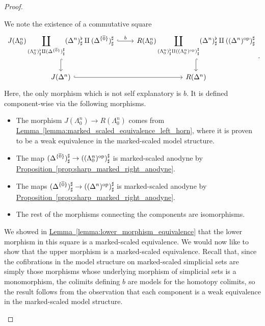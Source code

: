 \documentclass[main.tex]{subfiles}
\begin{document}
\begin{proof}
\begin{enumerate}
      We note the existence of a commutative square
      \begin{equation*}
        \begin{tikzcd}
          J(\Lambda^{n}_{0}) \displaystyle\coprod_{(\Lambda^{n}_{0})^{\flat}_{\sharp} \amalg (\Delta^{\{\overline{0}\}})^{\sharp}_{\sharp}}(\Delta^{n})^{\flat}_{\sharp} \amalg (\Delta^{\{\overline{0}\}})^{\sharp}_{\sharp}
          \arrow[r, hook, "b"]
          \arrow[d, hook]
          & R(\Lambda^{n}_{0}) \displaystyle\coprod_{(\Lambda^{n}_{0})^{\flat}_{\sharp} \amalg ((\Lambda^{n}_{0})\op)^{\sharp}_{\sharp}}(\Delta^{n})^{\flat}_{\sharp} \amalg ((\Delta^{n})\op)^{\sharp}_{\sharp}
          \arrow[d, hook]
          \\
          J(\Delta^{n})
          \arrow[r, hook]
          & R(\Delta^{n})
        \end{tikzcd}.
      \end{equation*}
      Here, the only morphism which is not self explanatory is $b$. It is defined component-wise via the following morphisms.
      \begin{itemize}
        \item The morphism $J(\Lambda^{n}_{0}) \to R(\Lambda^{n}_{0})$ comes from \hyperref[lemma:marked_scaled_equivalence_left_horn]{Lemma~\ref*{lemma:marked_scaled_equivalence_left_horn}}, where it is proven to be a weak equivalence in the marked-scaled model structure.

        \item The map $(\Delta^{\{\overline{0}\}})^{\sharp}_{\sharp} \to ((\Lambda^{n}_{0})^{\mathrm{op}})^{\sharp}_{\sharp}$ is marked-scaled anodyne by \hyperref[prop:sharp_marked_right_anodyne]{Proposition~\ref*{prop:sharp_marked_right_anodyne}}.

        \item The maps $(\Delta^{\{\overline{0}\}})^{\sharp}_{\sharp} \to ((\Delta^{n})^{\mathrm{op}})^{\sharp}_{\sharp}$ is marked-scaled anodyne by \hyperref[prop:sharp_marked_right_anodyne]{Proposition~\ref*{prop:sharp_marked_right_anodyne}}.

        \item The rest of the morphisms connecting the components are isomorphisms.
      \end{itemize}

      We showed in \hyperref[lemma:lower_morphism_equivalence]{Lemma~\ref*{lemma:lower_morphism_equivalence}} that the lower morphism in this square is a marked-scaled equivalence. We would now like to show that the upper morphism is a marked-scaled equivalence. Recall that, since the cofibrations in the model structure on marked-scaled simplicial sets are simply those morphisms whose underlying morphism of simplicial sets is a monomorphism, the colimits defining $b$ are models for the homotopy colimits, so the result follows from the observation that each component is a weak equivalence in the marked-scaled model structure.


\end{enumerate}
\end{proof}
\end{document}
